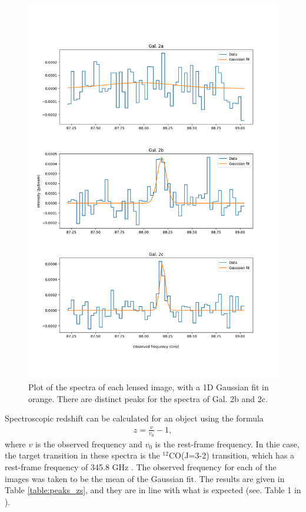 \documentclass[11pt]{article}
\begin{document}
\begin{figure}[!htbp]
    \centering
    \includegraphics[width=0.8\linewidth]{../figs/gaussian_fit.png}
    \caption{Plot of the spectra of each lensed image, with a 1D Gaussian fit in orange. There are distinct peaks for the spectra of Gal. 2b and 2c.}
    \label{fig:gaussian_fit}
\end{figure}

Spectroscopic redshift can be calculated for an object using the formula 
\begin{align*}
	z = \frac{v}{v_0} - 1,
\end{align*}
where $v$ is the observed frequency and $v_0$ is the rest-frame frequency. In thie case, the target transition in these spectra is the $^{12}$CO(J=3-2) transition, which has a rest-frame frequency of 345.8 GHz \citep{Carilli2013}. The observed frequency for each of the images was taken to be the mean of the Gaussian fit. The results are given in Table \ref{table:peaks_zs}, and they are in line with what is expected (see. Table 1 in \cite{MacKenzie2014}).
\end{document}
